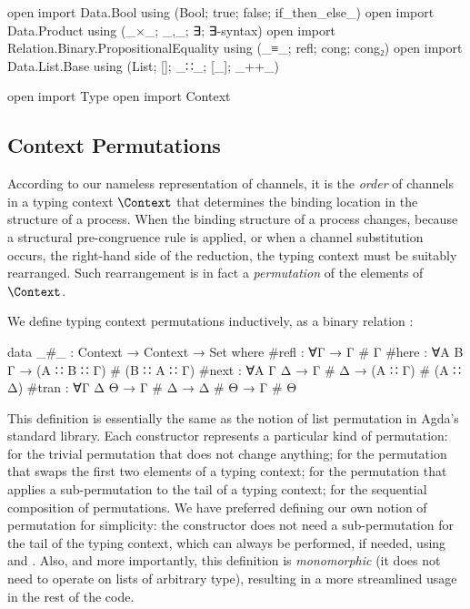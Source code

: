 \begin{code}[hide]
open import Data.Bool using (Bool; true; false; if_then_else_)
open import Data.Product using (_×_; _,_; ∃; ∃-syntax)
open import Relation.Binary.PropositionalEquality using (_≡_; refl; cong; cong₂)
open import Data.List.Base using (List; []; _∷_; [_]; _++_)

open import Type
open import Context
\end{code}

\subsection{Context Permutations}
\label{sec:permutations-agda}

According to our nameless representation of channels, it is the \emph{order} of
channels in a typing context $\Context$ that determines the binding location in
the structure of a process. When the binding structure of a process changes, \eg
because a structural pre-congruence rule is applied, or when a channel
substitution occurs, \cf the right-hand side of the \LinkRule reduction, the
typing context must be suitably rearranged. Such rearrangement is in fact a
\emph{permutation} of the elements of $\Context$.

We define typing context permutations inductively, as a binary relation
\AgdaDatatype{\_\#\_}:

\begin{code}
data _#_ : Context → Context → Set where
  #refl  : ∀{Γ} → Γ # Γ
  #here  : ∀{A B Γ} → (A ∷ B ∷ Γ) # (B ∷ A ∷ Γ)
  #next  : ∀{A Γ Δ} → Γ # Δ → (A ∷ Γ) # (A ∷ Δ)
  #tran  : ∀{Γ Δ Θ} → Γ # Δ → Δ # Θ → Γ # Θ
\end{code}

This definition is essentially the same as the notion of list permutation in
Agda's standard library. Each constructor represents a particular kind of
permutation:  for the trivial permutation that
does not change anything;  for the permutation
that swaps the first two elements of a typing context;
 for the permutation that applies a
sub-permutation to the tail of a typing context;
 for the sequential composition of
permutations.
%
We have preferred defining our own notion of permutation for simplicity: the
 constructor does not need a sub-permutation
for the tail of the typing context, which can always be performed, if needed,
using  and .
Also, and more importantly, this definition is \emph{monomorphic} (it does not
need to operate on lists of arbitrary type), resulting in a more streamlined
usage in the rest of the code.

